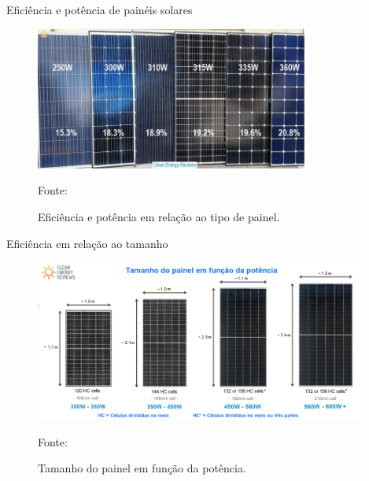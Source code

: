 \documentclass{beamer}
\begin{document}
\begin{frame}{Eficiência e potência de painéis solares}

\begin{figure}[H]
    \centering
    \includegraphics[width=0.8\textwidth]{./Figuras/pvs_pot.jpg}
    \caption{Eficiência e potência em relação ao tipo de painel.}{Fonte: \cite{cleanenergyreviews}}
   \label{fig:pvs_pot}
\end{figure}

\end{frame}


\begin{frame}{Eficiência em relação ao tamanho}

\begin{figure}[H]
    \centering
    \includegraphics[width=0.975\textwidth]{./Figuras/pv_size.png}
    \caption{Tamanho do painel em função da potência.}{Fonte: \cite{cleanenergyreviews}}
   \label{fig:pv_size}
\end{figure}

\end{frame}

\end{document}
